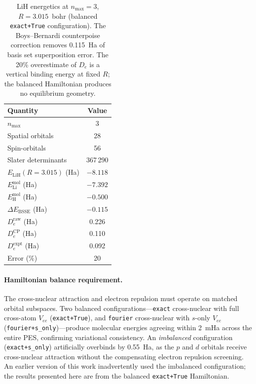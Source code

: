 \documentclass[aps,pra,twocolumn,superscriptaddress,longbibliography]{revtex4-2}
\begin{document}
\begin{table}[h]
\centering
\begin{tabular}{lc}
\toprule
Quantity & Value \\
\midrule
$n_{\max}$ & 3 \\
Spatial orbitals & 28 \\
Spin-orbitals & 56 \\
Slater determinants & 367\,290 \\
$E_{\mathrm{LiH}}(R{=}3.015)$ (Ha) & $-8.118$ \\
$E_{\mathrm{Li}}^{\mathrm{mol}}$ (Ha) & $-7.392$ \\
$E_{\mathrm{H}}^{\mathrm{mol}}$ (Ha) & $-0.500$ \\
$\Delta E_{\mathrm{BSSE}}$ (Ha) & $-0.115$ \\
$D_e^{\mathrm{raw}}$ (Ha) & 0.226 \\
$D_e^{\mathrm{CP}}$ (Ha) & 0.110 \\
$D_e^{\mathrm{expt}}$ (Ha) & 0.092 \\
Error (\%) & 20 \\
\bottomrule
\end{tabular}
\caption{LiH energetics at $n_{\max}=3$, $R=3.015$~bohr (balanced
\texttt{exact+True} configuration).  The Boys--Bernardi counterpoise
correction removes 0.115~Ha of basis set superposition error.  The
20\% overestimate of $D_e$ is a vertical binding energy at fixed $R$;
the balanced Hamiltonian produces no equilibrium geometry.}
\label{tab:lih_energies}
\end{table}

\paragraph{Hamiltonian balance requirement.}
The cross-nuclear attraction and electron repulsion must operate on
matched orbital subspaces.  Two balanced configurations---\texttt{exact}
cross-nuclear with full cross-atom $V_{ee}$ (\texttt{exact+True}), and
\texttt{fourier} cross-nuclear with $s$-only $V_{ee}$
(\texttt{fourier+s\_only})---produce molecular energies agreeing within
2~mHa across the entire PES, confirming variational consistency.  An
\emph{imbalanced} configuration (\texttt{exact+s\_only}) artificially
overbinds by 0.55~Ha, as the $p$ and $d$ orbitals receive cross-nuclear
attraction without the compensating electron repulsion screening.  An
earlier version of this work inadvertently used the imbalanced
configuration; the results presented here are from the balanced
\texttt{exact+True} Hamiltonian.
\end{document}
